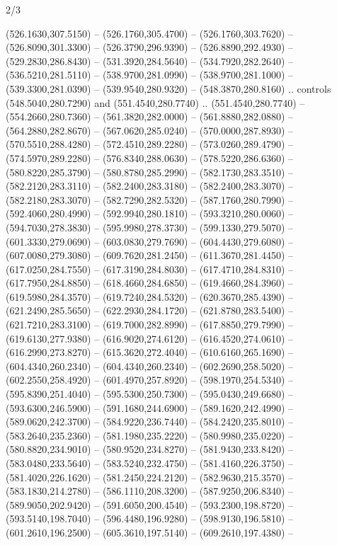 \begin{flagdescription}{2/3}
\begin{scope}[xshift=0.5\flaglength]
\begin{scope}[scale=0.00209\flagwidth,yshift=170mm,xshift=-360]
\begin{scope}[y=-0.8pt, x=0.8pt, inner sep=0pt, outer sep=0pt]
  (526.1630,307.5150) -- (526.1760,305.4700) -- (526.1760,303.7620) --
  (526.8090,301.3300) -- (526.3790,296.9390) -- (526.8890,292.4930) --
  (529.2830,286.8430) -- (531.3920,284.5640) -- (534.7920,282.2640) --
  (536.5210,281.5110) -- (538.9700,281.0990) -- (538.9700,281.1000) --
  (539.3300,281.0390) -- (539.9540,280.9320) -- (548.3870,280.8160) .. controls
  (548.5040,280.7290) and (551.4540,280.7740) .. (551.4540,280.7740) --
  (554.2660,280.7360) -- (561.3820,282.0000) -- (561.8880,282.0880) --
  (564.2880,282.8670) -- (567.0620,285.0240) -- (570.0000,287.8930) --
  (570.5510,288.4280) -- (572.4510,289.2280) -- (573.0260,289.4790) --
  (574.5970,289.2280) -- (576.8340,288.0630) -- (578.5220,286.6360) --
  (580.8220,285.3790) -- (580.8780,285.2990) -- (582.1730,283.3510) --
  (582.2120,283.3110) -- (582.2400,283.3180) -- (582.2400,283.3070) --
  (582.2180,283.3070) -- (582.7290,282.5320) -- (587.1760,280.7990) --
  (592.4060,280.4990) -- (592.9940,280.1810) -- (593.3210,280.0060) --
  (594.7030,278.3830) -- (595.9980,278.3730) -- (599.1330,279.5070) --
  (601.3330,279.0690) -- (603.0830,279.7690) -- (604.4430,279.6080) --
  (607.0080,279.3080) -- (609.7620,281.2450) -- (611.3670,281.4450) --
  (617.0250,284.7550) -- (617.3190,284.8030) -- (617.4710,284.8310) --
  (617.7950,284.8850) -- (618.4660,284.6850) -- (619.4660,284.3960) --
  (619.5980,284.3570) -- (619.7240,284.5320) -- (620.3670,285.4390) --
  (621.2490,285.5650) -- (622.2930,284.1720) -- (621.8780,283.5400) --
  (621.7210,283.3100) -- (619.7000,282.8990) -- (617.8850,279.7990) --
  (619.6130,277.9380) -- (616.9020,274.6120) -- (616.4520,274.0610) --
  (616.2990,273.8270) -- (615.3620,272.4040) -- (610.6160,265.1690) --
  (604.4340,260.2340) -- (604.4340,260.2340) -- (602.2690,258.5020) --
  (602.2550,258.4920) -- (601.4970,257.8920) -- (598.1970,254.5340) --
  (595.8390,251.4040) -- (595.5300,250.7300) -- (595.0430,249.6680) --
  (593.6300,246.5900) -- (591.1680,244.6900) -- (589.1620,242.4990) --
  (589.0620,242.3700) -- (584.9220,236.7440) -- (584.2420,235.8010) --
  (583.2640,235.2360) -- (581.1980,235.2220) -- (580.9980,235.0220) --
  (580.8820,234.9010) -- (580.9520,234.8270) -- (581.9430,233.8420) --
  (583.0480,233.5640) -- (583.5240,232.4750) -- (581.4160,226.3750) --
  (581.4020,226.1620) -- (581.2450,224.2120) -- (582.9630,215.3570) --
  (583.1830,214.2780) -- (586.1110,208.3200) -- (587.9250,206.8340) --
  (589.9050,202.9420) -- (591.6050,200.4540) -- (593.2300,198.8720) --
  (593.5140,198.7040) -- (596.4480,196.9280) -- (598.9130,196.5810) --
  (601.2610,196.2500) -- (605.3610,197.5140) -- (609.2610,197.4380) --

\end{scope}
\end{scope}
\end{scope}
\end{flagdescription}

